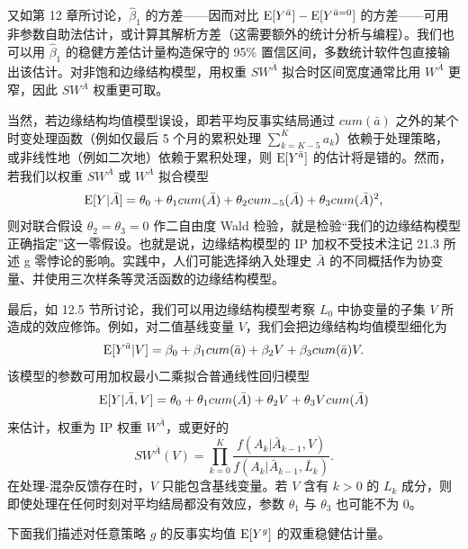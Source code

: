 
又如第 12 章所讨论，$\hat\beta_1$ 的方差——因而对比 $\mathrm{E}[Y^{\bar a}]-\mathrm{E}[Y^{\bar a=0}]$ 的方差——可用非参数自助法估计，或计算其解析方差（这需要额外的统计分析与编程）。我们也可以用 $\hat\beta_1$ 的稳健方差估计量构造保守的 95\% 置信区间，多数统计软件包直接输出该估计。对非饱和边缘结构模型，用权重 $SW^{\bar A}$ 拟合时区间宽度通常比用 $W^{\bar A}$ 更窄，因此 $SW^{\bar A}$ 权重更可取。

当然，若边缘结构均值模型误设，即若平均反事实结局通过 $cum(\bar a)$ 之外的某个时变处理函数（例如仅最后 5 个月的累积处理 $\sum_{k=K-5}^{K}a_k$）依赖于处理策略，或非线性地（例如二次地）依赖于累积处理，则 $\mathrm{E}[Y^{\bar a}]$ 的估计将是错的。然而，若我们以权重 $SW^{\bar A}$ 或 $W^{\bar A}$ 拟合模型
\[
\mathrm{E}[Y|\bar A]=\theta_0+\theta_1cum(\bar A)+\theta_2cum_{-5}(\bar A)+\theta_3cum(\bar A)^2,
\]
则对联合假设 $\theta_2=\theta_3=0$ 作二自由度 Wald 检验，就是检验“我们的边缘结构模型正确指定”这一零假设。也就是说，边缘结构模型的 IP 加权不受技术注记 21.3 所述 g 零悖论的影响。实践中，人们可能选择纳入处理史 $\bar A$ 的不同概括作为协变量、并使用三次样条等灵活函数的边缘结构模型。


最后，如 12.5 节所讨论，我们可以用边缘结构模型考察 $L_0$ 中协变量的子集 $V$ 所造成的效应修饰。例如，对二值基线变量 $V$，我们会把边缘结构均值模型细化为
\[
\mathrm{E}[Y^{\bar a}|V]=\beta_0+\beta_1cum(\bar a)+\beta_2V+\beta_3cum(\bar a)V.
\]
该模型的参数可用加权最小二乘拟合普通线性回归模型
\[
\mathrm{E}[Y|\bar A,V]=\theta_0+\theta_1cum(\bar A)+\theta_2V+\theta_3Vcum(\bar A)
\]
来估计，权重为 IP 权重 $W^{\bar A}$，或更好的
\[
SW^{\bar A}(V)=\prod_{k=0}^{K}\frac{f(A_k|\bar A_{k-1},V)}{f(A_k|\bar A_{k-1},\bar L_k)}.
\]
在处理-混杂反馈存在时，$V$ 只能包含基线变量。若 $V$ 含有 $k>0$ 的 $L_k$ 成分，则即使处理在任何时刻对平均结局都没有效应，参数 $\theta_1$ 与 $\theta_3$ 也可能不为 0。

下面我们描述对任意策略 $g$ 的反事实均值 $\mathrm{E}[Y^g]$ 的双重稳健估计量。

